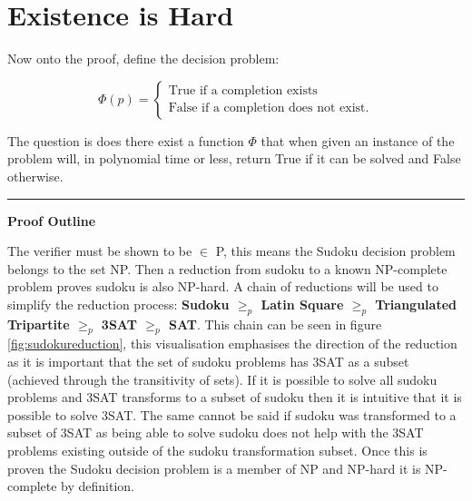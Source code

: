 \documentclass[a4paper,11pt]{report}
\begin{document}

\section{Existence is Hard}
		
Now onto the proof, define the decision problem:

		\begin{equation}
		        \Phi (p) = \begin{cases}
		            \text{True if a completion exists} \\
		            \text{False if a completion does not exist}.
				\end{cases}
		\end{equation}

The question is does there exist a function $\Phi$ that when given an instance of the problem will, in polynomial time or less,
return True if it can be solved and False otherwise.

\noindent\rule{4cm}{0.4pt}

\textbf{Proof Outline}

The verifier must be shown to be $\in$ P, this means the Sudoku decision problem belongs to the set NP. Then a reduction from sudoku to a known NP-complete problem proves sudoku is also NP-hard. A chain of reductions will be used to simplify the reduction process: \textbf{Sudoku $\geq_p$ Latin Square $\geq_p$ Triangulated Tripartite $\geq_p$ 3SAT $\geq_p$ SAT}. This chain can be seen in figure \ref{fig:sudokureduction}, this visualisation emphasises the direction of the reduction as it is important that the set of sudoku problems has 3SAT as a subset (achieved through the transitivity of sets). If it is possible to solve all sudoku problems and 3SAT transforms to a subset of sudoku then it is intuitive that it is possible to solve 3SAT. The same cannot be said if sudoku was transformed to a subset of 3SAT as being able to solve sudoku does not help with the 3SAT problems existing outside of the sudoku transformation subset. Once this is proven the Sudoku decision problem is a member of NP and NP-hard it is NP-complete by definition.
\end{document}
